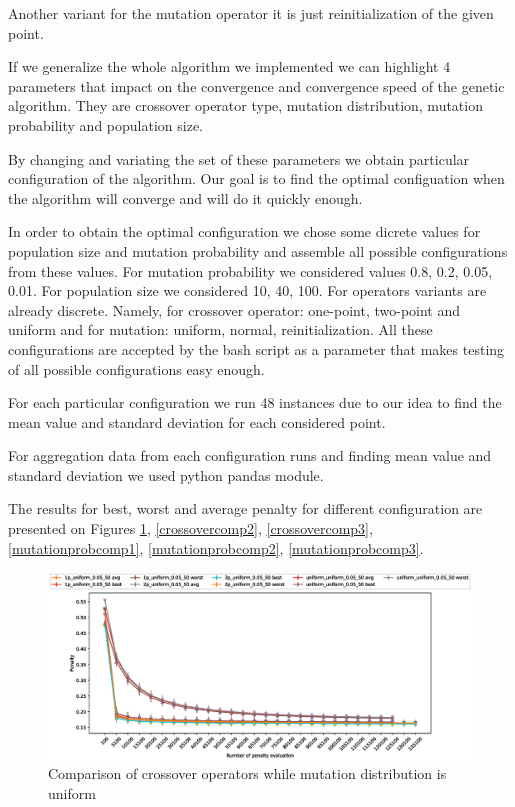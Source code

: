 \documentclass{article}
\begin{document}
Another variant for the mutation operator it is just reinitialization of the given point. 

If we generalize the whole algorithm we implemented we can highlight 4 parameters that impact on the convergence and convergence speed of the genetic algorithm. They are crossover operator type, mutation distribution, mutation probability and population size.

By changing and variating the set of these parameters we obtain particular configuration of the algorithm. Our goal is to find the optimal configuation when the algorithm will converge and will do it quickly enough.

In order to obtain the optimal configuration we chose some dicrete values for population size and mutation probability and assemble all possible configurations from these values. For mutation probability we considered values 0.8, 0.2, 0.05, 0.01. For population size we considered 10, 40, 100. For operators variants are already discrete. Namely, for crossover operator: one-point, two-point and uniform and for mutation: uniform, normal, reinitialization. All these configurations are accepted by the bash script as a parameter that makes testing of all possible configurations easy enough.

For each particular configuration we run 48 instances due to our idea to find the mean value and standard deviation for each considered point.

For aggregation data from each configuration runs and finding mean value and standard deviation we used python pandas module.

The results for best, worst and average penalty for different configuration are presented on Figures \ref{crossovercomp1}, \ref{crossovercomp2}, \ref{crossovercomp3}, \ref{mutationprobcomp1}, \ref{mutationprobcomp2}, \ref{mutationprobcomp3}.


\begin{figure}
    \centering
    \includegraphics[width=5.0in]{crossover_comparison_md_uniform}
    \caption{Comparison of crossover operators while mutation distribution is uniform}
    \label{crossovercomp1}
\end{figure}
\end{document}
